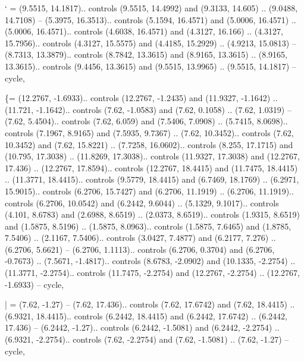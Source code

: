 ` = {(9.5515, 14.1817).. controls (9.5515, 14.4992) and (9.3133, 14.605) .. (9.0488, 14.7108) -- (5.3975, 16.3513).. controls (5.1594, 16.4571) and (5.0006, 16.4571) .. (5.0006, 16.4571).. controls (4.6038, 16.4571) and (4.3127, 16.166) .. (4.3127, 15.7956).. controls (4.3127, 15.5575) and (4.4185, 15.2929) .. (4.9213, 15.0813) -- (8.7313, 13.3879).. controls (8.7842, 13.3615) and (8.9165, 13.3615) .. (8.9165, 13.3615).. controls (9.4456, 13.3615) and (9.5515, 13.9965) .. (9.5515, 14.1817) -- cycle},

\{= {(12.2767, -1.6933).. controls (12.2767, -1.2435) and (11.9327, -1.1642) .. (11.721, -1.1642).. controls (7.62, -1.0583) and (7.62, 0.1058) .. (7.62, 1.0319) -- (7.62, 5.4504).. controls (7.62, 6.059) and (7.5406, 7.0908) .. (5.7415, 8.0698).. controls (7.1967, 8.9165) and (7.5935, 9.7367) .. (7.62, 10.3452).. controls (7.62, 10.3452) and (7.62, 15.8221) .. (7.7258, 16.0602).. controls (8.255, 17.1715) and (10.795, 17.3038) .. (11.8269, 17.3038).. controls (11.9327, 17.3038) and (12.2767, 17.436) .. (12.2767, 17.8594).. controls (12.2767, 18.4415) and (11.7475, 18.4415) .. (11.3771, 18.4415).. controls (9.5779, 18.4415) and (6.7469, 18.1769) .. (6.2971, 15.9015).. controls (6.2706, 15.7427) and (6.2706, 11.1919) .. (6.2706, 11.1919).. controls (6.2706, 10.0542) and (6.2442, 9.6044) .. (5.1329, 9.1017).. controls (4.101, 8.6783) and (2.6988, 8.6519) .. (2.0373, 8.6519).. controls (1.9315, 8.6519) and (1.5875, 8.5196) .. (1.5875, 8.0963).. controls (1.5875, 7.6465) and (1.8785, 7.5406) .. (2.1167, 7.5406).. controls (3.0427, 7.4877) and (6.2177, 7.276) .. (6.2706, 5.6621) -- (6.2706, 1.1113).. controls (6.2706, 0.3704) and (6.2706, -0.7673) .. (7.5671, -1.4817).. controls (8.6783, -2.0902) and (10.1335, -2.2754) .. (11.3771, -2.2754).. controls (11.7475, -2.2754) and (12.2767, -2.2754) .. (12.2767, -1.6933) -- cycle},

| = {(7.62, -1.27) -- (7.62, 17.436).. controls (7.62, 17.6742) and (7.62, 18.4415) .. (6.9321, 18.4415).. controls (6.2442, 18.4415) and (6.2442, 17.6742) .. (6.2442, 17.436) -- (6.2442, -1.27).. controls (6.2442, -1.5081) and (6.2442, -2.2754) .. (6.9321, -2.2754).. controls (7.62, -2.2754) and (7.62, -1.5081) .. (7.62, -1.27) -- cycle},

